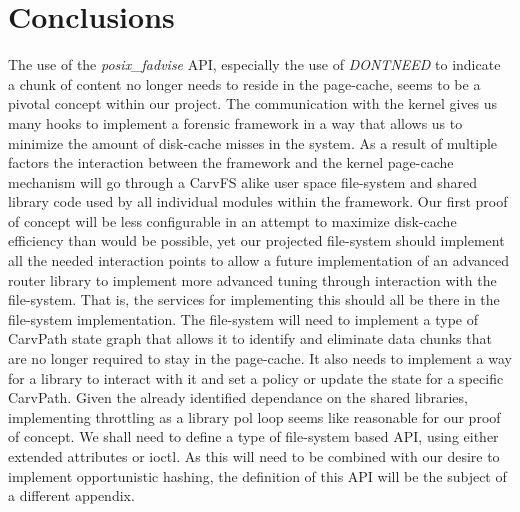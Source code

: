 \section{Conclusions}
The use of the \emph{posix\_fadvise} API, especially the use of \emph{DONTNEED} to indicate a chunk of content no longer needs to reside in the page-cache, seems to be a pivotal concept within our project. 
The communication with the kernel gives us many hooks to implement a forensic framework in a way that allows us to minimize the amount of disk-cache misses in the system. As a result of multiple factors the interaction between the framework and the kernel page-cache mechanism will go through a CarvFS alike user space file-system and shared library code used by all individual modules within the framework. Our first proof of concept will be less configurable in an attempt to maximize disk-cache efficiency than would be possible, yet our projected file-system should implement all the needed interaction points to allow a future implementation of an advanced router library to implement more advanced tuning through interaction with the file-system. That is, the services for implementing this should all be there in the file-system implementation. The file-system will need to implement a type of CarvPath state graph that allows it to identify and eliminate data chunks that are no longer required to stay in the page-cache. It also needs to implement a way for a library to interact with it and set a policy or update the state for a specific CarvPath. Given the already identified dependance on the shared libraries, implementing throttling as a library pol loop seems like reasonable for our proof of concept. We shall need to define a type of file-system based API, using either extended attributes or ioctl. As this will need to be combined with our desire to implement opportunistic hashing, the definition of this API will be the subject of a different appendix.

